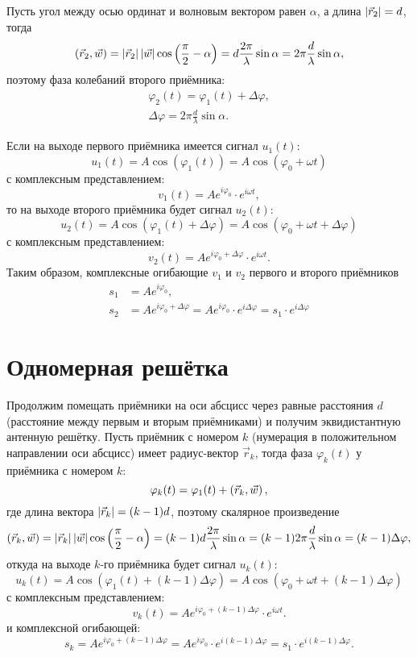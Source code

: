 Пусть угол между осью ординат и волновым вектором равен $\alpha$, а длина $\left | \vec{r}_2 \right | = d$, тогда
\begin{gather*}
    \left ( \vec{r}_2, \vec{w} \right )
    = \left | \vec{r}_2 \right | \left | \vec{w} \right | \cos \left ( \frac{\pi}{2} - \alpha \right )
    = d \frac{2 \pi}{\lambda} \sin \alpha
    = 2 \pi \frac{d}{\lambda} \sin \alpha ,
\end{gather*}
поэтому фаза колебаний второго приёмника:
\begin{gather*}
    \varphi_2(t) = \varphi_1(t) + \Delta \varphi , \\
    \Delta \varphi = 2 \pi \frac{d}{\lambda} \sin \alpha .
\end{gather*}

Если на выходе первого приёмника имеется сигнал $u_1(t)$:
\[
    u_1(t)
    = A \cos \left ( \varphi_1(t) \right )
    = A \cos \left ( \varphi_0 + \omega t \right )
\]
с комплексным представлением:
\[
    v_1(t)
    = A e^{i \varphi_0} \cdot e^{i \omega t} ,
\]
то на выходе второго приёмника будет сигнал $u_2(t)$:
\[
    u_2(t)
    = A \cos \left ( \varphi_1(t) + \Delta \varphi \right )
    = A \cos \left ( \varphi_0 + \omega t + \Delta \varphi \right )
\]
с комплексным представлением:
\[
    v_2(t)
    = A e^{i \varphi_0 + \Delta \varphi } \cdot e^{i \omega t} .
\]
Таким образом, комплексные огибающие $v_1$ и $v_2$ первого и второго приёмников
\begin{align*}
    s_1 & = A e^{i \varphi_0} , \\
    s_2 & = A e^{i \varphi_0 + \Delta \varphi} = A e^{i \varphi_0} \cdot e^{i \Delta \varphi} = s_1 \cdot e^{i \Delta \varphi}
\end{align*}


\section{Одномерная решётка}

Продолжим помещать приёмники на оси абсцисс через равные расстояния $d$ (расстояние между первым и вторым приёмниками) и получим эквидистантную антенную решётку.
Пусть приёмник с номером $k$ (нумерация в положительном направлении оси абсцисс) имеет радиус-вектор $\vec{r}_k$, тогда фаза $\varphi_k(t)$ у приёмника
с номером $k$:
\[
    \varphi_k(t) = \varphi_1(t) + \left ( \vec{r}_k, \vec{w} \right ),
\]
где длина вектора $\left | \vec{r}_k \right | = (k-1) d$, поэтому скалярное произведение
\[
    \left ( \vec{r}_k, \vec{w} \right )
    = \left | \vec{r}_k \right | \left | \vec{w} \right | \cos \left ( \frac{\pi}{2} - \alpha \right )
    = (k-1) d \frac{2 \pi}{\lambda} \sin \alpha
    = (k-1) 2 \pi \frac{d}{\lambda} \sin \alpha
    = (k-1) \Delta \varphi,
\]
откуда на выходе $k$-го приёмника будет сигнал $u_k(t)$:
\[
    u_k(t)
    = A \cos \left ( \varphi_1(t) + (k-1) \Delta \varphi \right )
    = A \cos \left ( \varphi_0 + \omega t + (k-1) \Delta \varphi \right )
\]
с комплексным представлением:
\[
    v_k(t)
    = A e^{i \varphi_0 + (k-1) \Delta \varphi } \cdot e^{i \omega t} .
\]
и комплексной огибающей:
\[
    s_k
    = A e^{i \varphi_0 + (k-1) \Delta \varphi }
    = A e^{i \varphi_0 } \cdot e^{i (k-1) \Delta \varphi}
    = s_1 \cdot e^{i (k-1) \Delta \varphi} .
\]


